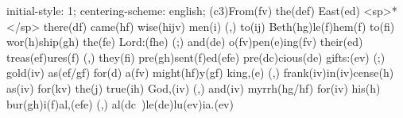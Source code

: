 initial-style: 1;
centering-scheme: english;
(c3)From(fv) the(def) East(ed) <sp>*</sp> there(df) came(hf) wise(hijv) men(i) (,) to(ij) Beth(hg)le(f)hem(f) to(fi) wor(h)ship(gh) the(fe) Lord:(fhe) (;) and(de) o(fv)pen(e)ing(fv) their(ed) treas(ef)ures(f) (,) they(fi) pre(gh)sent(f)ed(efe) pre(dc)cious(de) gifts:(ev) (;) gold(iv) as(ef/gf) for(d) a(fv) might(hf)y(gf) king,(e) (,) frank(iv)in(iv)cense(h) as(iv) for(kv) the(j) true(ih) God,(iv) (,) and(iv) myrrh(hg/hf) for(iv) his(h) bur(gh)i(f)al,(efe) (,) al(dc~)le(de)lu(ev)ia.(ev)
